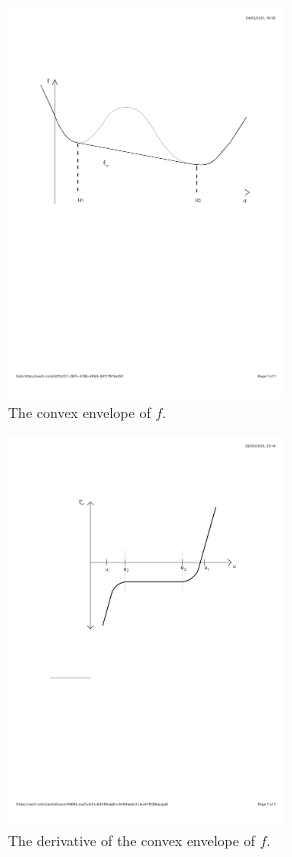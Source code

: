 \documentclass{article}
\numberwithin{equation}{section}
\begin{document}
   \begin{minipage}{\linewidth}
  \centering
  \begin{minipage}{0.45\linewidth}
      \begin{figure}[H]
          \includegraphics[clip, trim=2cm 14cm 2cm 2cm, width=0.65\textwidth]{Figures/ConservationLaws/convex_envelope.pdf}
          \caption{The convex envelope of $f$.}
      \end{figure}
  \end{minipage}
  \hspace{0.05\linewidth}
  \begin{minipage}{0.45\linewidth}
      \begin{figure}[H]
          \includegraphics[clip, trim=2cm 14cm 2cm 2cm, width=0.65\textwidth]{Figures/ConservationLaws/convex_derivative.pdf}
          \caption{The derivative of the convex envelope of $f$.}
      \end{figure}
  \end{minipage}
\end{minipage}  
\end{document}
